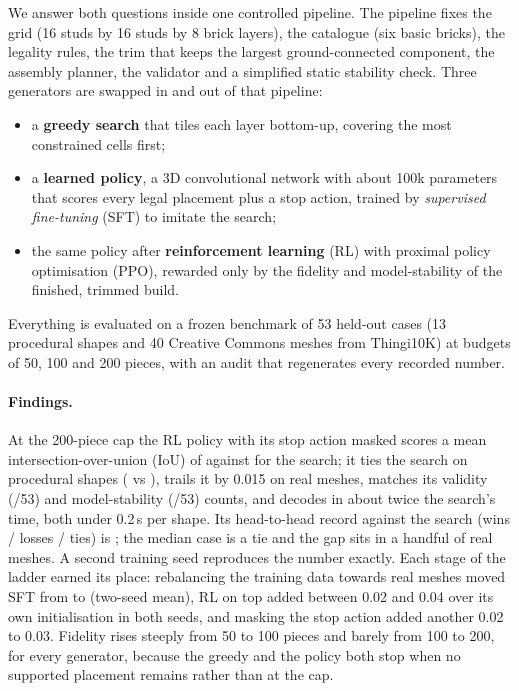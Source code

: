 We answer both questions inside one controlled pipeline. The pipeline fixes the grid (16 studs by 16 studs by 8 brick
layers), the catalogue (six basic bricks), the legality rules, the trim that keeps the largest ground-connected
component, the assembly planner, the validator and a simplified static stability check. Three generators are swapped
in and out of that pipeline:
\begin{itemize}
  \item a \textbf{greedy search} that tiles each layer bottom-up, covering the most constrained cells first;
  \item a \textbf{learned policy}, a 3D convolutional network with about 100k parameters that scores every legal
  placement plus a stop action, trained by \emph{supervised fine-tuning} (SFT) to imitate the search;
  \item the same policy after \textbf{reinforcement learning} (RL) with proximal policy optimisation (PPO), rewarded
  only by the fidelity and model-stability of the finished, trimmed build.
\end{itemize}
Everything is evaluated on a frozen benchmark of 53 held-out cases (13 procedural shapes and 40 Creative Commons
meshes from Thingi10K) at budgets of 50, 100 and 200 pieces, with an audit that regenerates every recorded number.

\paragraph{Findings.} At the 200-piece cap the RL policy with its stop action masked scores a mean intersection-over-union
(IoU) of \meanRlVTwoNostopTwoHundred{} against \meanGreedyVOneTwoHundred{} for the search; it ties the search on procedural shapes
(\meanRlVTwoNostopProc{} vs \meanGreedyVOneProc{}), trails it by 0.015 on real meshes, matches its validity (\validRlVTwoNostop/53) and
model-stability (\stableRlVTwoNostop/53) counts, and decodes in about twice the search's time, both under 0.2\,s per shape.
Its head-to-head record against the search (wins / losses / ties) is \hhRlVTwoNostopVsGreedyVOne; the median case is a tie
and the gap sits in a handful of real meshes. A second training seed reproduces the number exactly. Each stage of the ladder earned its
place: rebalancing the training data towards real meshes moved SFT from \meanSftVOneTwoHundred{} to \famSftVTwoTwoHundred{} (two-seed mean),
RL on top added between 0.02 and 0.04 over its own initialisation in both seeds, and masking the stop action
added another 0.02 to 0.03. Fidelity rises steeply from 50 to 100 pieces and barely from 100 to 200, for every
generator, because the greedy and the policy both stop when no supported placement remains rather than at the cap.

